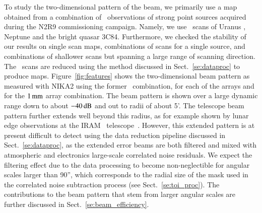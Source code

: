 To study the two-dimensional pattern of the beam, we 
primarily use a map obtained from a combination of \bm\ observations
of strong point sources acquired during the N2R9 commissioning campaign.
Namely, we use \bm\ scans of Uranus%
,  Neptune %
and the bright quasar 3C84. %
Furthermore, we checked the stability of our results on single scan
maps, combinations of scans for a single source, and combinations of
shallower scans but spanning a large range of scanning direction. {\lp
The \bm\ scans are reduced using the method discussed in
Sect.~\ref{se:dataproc} to produce maps.}
{\lp Figure~\ref{fig:features} shows the two-dimensional beam pattern
as measured with NIKA2 using the former \bm\ combination, for each of
the arrays and for the $1\,\rm{mm}$ array combination.}
{\lp The beam pattern is shown over a large dynamic range down
to about $-40\,\rm{dB}$ and out to radii of about 5’.
The telescope beam pattern further extends well beyond this radius, as for
example shown by lunar edge observations
at the IRAM \trentemetre\ telescope~\citep{Greve1998,
Kramer2013}. However,
this extended pattern is at present difficult to detect using the data
reduction pipeline discussed in Sect.~\ref{se:dataproc}, as
the extended error beams are both filtered and mixed with 
atmospheric and electronics large-scale correlated noise
residuals. {\rev We expect the filtering effect due to the data
processing to become non-neglectible for angular scales larger than
90'', which corresponds to the radial size of the mask used in the
correlated noise subtraction process (see Sect.~\ref{se:toi_proc}).}
The contributions to the beam pattern that stem from larger angular scales are
further discussed in Sect.~\ref{se:beam_efficiency}.} 



